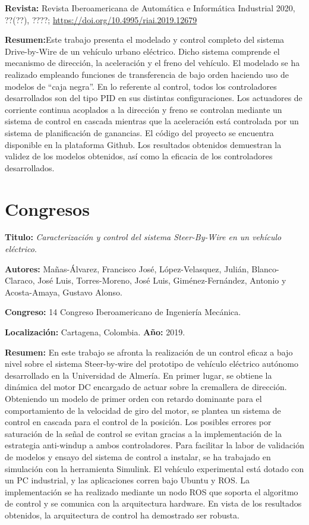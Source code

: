 \textbf{Revista:} Revista Iberoamericana de Automática e Informática Industrial 2020, ??(??), ????; \url{https://doi.org/10.4995/riai.2019.12679}

\textbf{Resumen:}Este trabajo presenta el modelado y control completo del sistema Drive-by-Wire de un vehículo urbano eléctrico. Dicho sistema comprende el mecanismo de dirección, la aceleración y el freno del vehículo. El modelado se ha realizado empleando funciones de transferencia de bajo orden haciendo uso de modelos de “caja negra”. En lo referente al control, todos los controladores desarrollados son del tipo PID en sus distintas configuraciones. Los actuadores de corriente continua acoplados a la dirección y freno se controlan mediante un sistema de control en cascada mientras que la aceleración está controlada por un sistema de planificación de ganancias. El código del proyecto se encuentra disponible en la plataforma Github. Los resultados obtenidos demuestran la validez de los modelos obtenidos, así como la eficacia de los controladores desarrollados.

\section{Congresos}
\textbf{Titulo:} \textit{Caracterización y control del sistema Steer-By-Wire en un vehículo eléctrico}\cite{manas2019CIBIM}.

\textbf{Autores:} Mañas-Álvarez, Francisco José, López-Velasquez, Julián, Blanco-Claraco, José Luis, Torres-Moreno, José Luis, Giménez-Fernández, Antonio y Acosta-Amaya, Gustavo Alonso.

\textbf{Congreso:} 14 Congreso Iberoamericano de Ingeniería Mecánica.

\textbf{Localización:} Cartagena, Colombia. \textbf{Año:} 2019. 

\textbf{Resumen:} En este trabajo se afronta la realización de un control eficaz a bajo nivel sobre el sistema Steer-by-wire del prototipo de vehículo eléctrico autónomo desarrollado en la Universidad de Almería. En primer lugar, se obtiene la dinámica del motor DC encargado de actuar sobre la cremallera de dirección. Obteniendo un modelo de primer orden con retardo dominante para el comportamiento de la velocidad de giro del motor, se plantea un sistema de control en cascada para el control de la posición. Los posibles errores por saturación de la señal de control se evitan gracias a la implementación de la estrategia anti-windup a ambos controladores. Para facilitar la labor de validación de modelos y ensayo del sistema de control a instalar, se ha trabajado en simulación con la herramienta Simulink. El vehículo experimental está dotado con un PC industrial, y las aplicaciones corren bajo Ubuntu y ROS. La implementación se ha realizado mediante un nodo ROS que soporta el algoritmo de control y se comunica con la arquitectura hardware. En vista de los resultados obtenidos, la arquitectura de control ha demostrado ser robusta.

\afterpage{\blankpage}